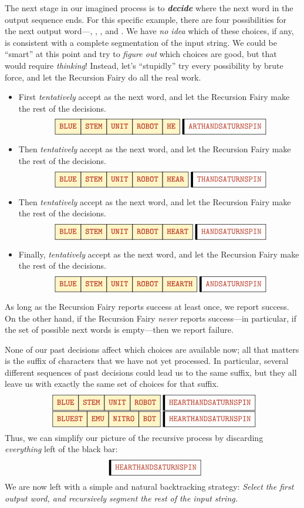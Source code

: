 The next stage in our imagined process is to \textbf{\textit{decide}} where the next word in the output sequence ends.
For this specific example, there are four possibilities for the next output word---, , , and .
We have \textit{no idea} which of these choices, if any, is consistent with a complete segmentation of the input string.
We could be “smart” at this point and try to \textit{figure out} which choices are good, but that would require \textit{thinking}!
Instead, let’s “stupidly” try every possibility by brute force, and let the Recursion Fairy do all the real work.
\begin{itemize}
\item First \textit{tentatively} accept  as the next word, and let the Recursion Fairy make the rest of the decisions.
\[
\Segments{BLUE,STEM,UNIT,ROBOT,HE}{ARTHANDSATURNSPIN}
\]
\item Then \textit{tentatively} accept  as the next word, and let the Recursion Fairy make the rest of the decisions.
\[
\Segments{BLUE,STEM,UNIT,ROBOT,HEAR}{THANDSATURNSPIN}
\]
\item Then \textit{tentatively} accept  as the next word, and let the Recursion Fairy make the rest of the decisions.
\[
\Segments{BLUE,STEM,UNIT,ROBOT,HEART}{HANDSATURNSPIN}
\]
\item Finally, \textit{tentatively} accept  as the next word, and let the Recursion Fairy make the rest of the decisions.
\[
\Segments{BLUE,STEM,UNIT,ROBOT,HEARTH}{ANDSATURNSPIN}
\]
\end{itemize}
As long as the Recursion Fairy reports success at least once, we report success.
On the other hand, if the Recursion Fairy \textit{never} reports success---in particular, if the set of possible next words is empty---then we report failure.

None of our past decisions affect which choices are available now; all that matters is the suffix of characters that we have not yet processed.
In particular, several different sequences of past decisions could lead us to the same suffix, but they all leave us with exactly the same set of choices for that suffix.
\[
\begin{array}{c}
\Segments{BLUE,STEM,UNIT,ROBOT}{HEARTHANDSATURNSPIN}\\[1ex]
\Segments{BLUEST,EMU,NITRO,BOT}{HEARTHANDSATURNSPIN}
\end{array}
\]
Thus, we can simplify our picture of the recursive process by discarding \textit{everything} left of the black bar:
\[
\Segments{}{HEARTHANDSATURNSPIN}
\]
We are now left with a simple and natural backtracking strategy: \textit{Select the first output word, and recursively segment the rest of the input string.}

